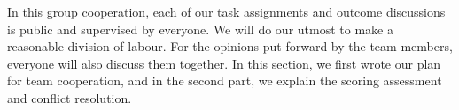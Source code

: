 \noindent In this group cooperation, each of our task assignments and outcome discussions is public and supervised by everyone. We will do our utmost to make a reasonable division of labour. For the opinions put forward by the team members, everyone will also discuss them together. In this section, we first wrote our plan for team cooperation, and in the second part, we explain the scoring assessment and conflict resolution.







